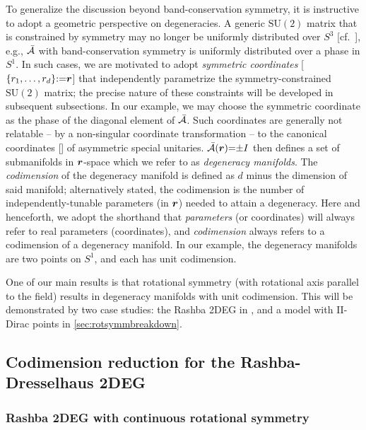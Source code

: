 \documentclass[aps, showpacs, twocolumn, notitlepage, superscriptaddress]{revtex4-1}
\begin{document}
To generalize the discussion beyond band-conservation symmetry, it is instructive to adopt a geometric perspective on degeneracies. A generic $\text{SU}(2)$ matrix that is constrained by symmetry may no longer be uniformly distributed over $S^3$ [cf.\ ], e.g., ${\cal \bar{A}}$ with band-conservation symmetry is uniformly distributed over a phase in $S^1$. In such cases, we are  motivated to adopt \textit{symmetric coordinates} [$\{r_1,\ldots,r_{d}\}{:}{=}\boldsymbol{r}$] that independently parametrize the symmetry-constrained $\text{SU}(2)$ matrix; the precise nature of these constraints will be developed in subsequent subsections.
In our example, we may choose the symmetric coordinate as the phase of the diagonal element of ${\cal \bar{A}}$. Such coordinates are generally not relatable -- by a non-singular coordinate transformation -- to the canonical coordinates [] of asymmetric special unitaries. ${\cal \bar{A}}(\boldsymbol{r}){=}{\pm}I$ then defines a set of submanifolds in $\boldsymbol{r}$-space which we refer to as \textit{degeneracy manifolds}. The \textit{codimension} of the degeneracy manifold  is defined as $d$ minus the dimension of said manifold; alternatively stated, the codimension is the number of independently-tunable parameters (in $\boldsymbol{r}$) needed to attain a degeneracy. Here and henceforth, we adopt the shorthand that  \textit{parameters} (or coordinates) will always refer to real parameters (coordinates), and \textit{codimension} always refers to a codimension of a degeneracy manifold. In our example, the degeneracy manifolds  are two points on $S^1$, and each has unit codimension. 
 
One of our main results is that  rotational symmetry (with rotational axis parallel to the field) results in degeneracy manifolds with unit codimension. This will be demonstrated by two  case studies: the Rashba 2DEG in , and a model with II-Dirac points in \ref{sec:rotsymmbreakdown}. 

\subsection{Codimension reduction for the Rashba-Dresselhaus 2DEG}\label{sec:singleparameterrashba}

\subsubsection{Rashba 2DEG with continuous rotational symmetry}\label{sec:ctsrot}
\end{document}
